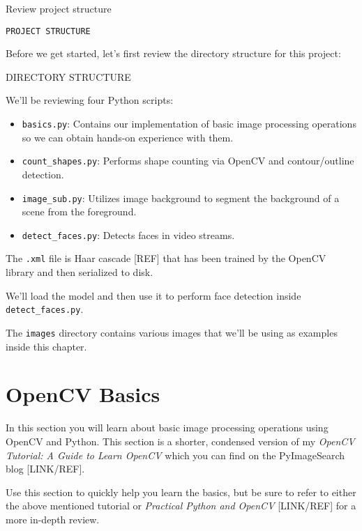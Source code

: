 Review project structure

\begin{verbatim}
PROJECT STRUCTURE
\end{verbatim}

Before we get started, let’s first review the directory structure for this project:

DIRECTORY STRUCTURE

We’ll be reviewing four Python scripts:

\begin{itemize}
    \item \texttt{basics.py}: Contains our implementation of basic image processing operations so we can obtain hands-on experience with them.
    \item \texttt{count_shapes.py}: Performs shape counting via OpenCV and contour/outline detection.
    \item \texttt{image_sub.py}: Utilizes image background to segment the background of a scene from the foreground.
    \item \texttt{detect_faces.py}: Detects faces in video streams.
\end{itemize}

The \texttt{.xml} file is Haar cascade [REF] that has been trained by the OpenCV library and then serialized to disk.

We’ll load the model and then use it to perform face detection inside \texttt{detect_faces.py}.

The \texttt{images} directory contains various images that we’ll be using as examples inside this chapter.


\section{OpenCV Basics}

In this section you will learn about basic image processing operations using OpenCV and Python. This section is a shorter, condensed version of my \textit{OpenCV Tutorial: A Guide to Learn OpenCV} which you can find on the PyImageSearch blog [LINK/REF].

Use this section to quickly help you learn the basics, but be sure to refer to either the above mentioned tutorial or \textit{Practical Python and OpenCV} [LINK/REF] for a more in-depth review.

